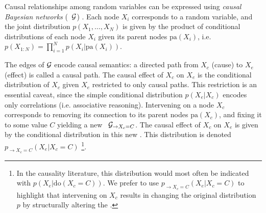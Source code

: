 Causal relationships among random variables can be expressed using \emph{causal Bayesian networks} (\CBNs~${\cal G}$)  \citep{pearl2000,spirtes2000causation,dawid07fundamentals}. Each node $X_i$ corresponds to a random variable, and the joint distribution $p(X_1, \ldots, X_N)$ is given by the product of conditional distributions of each node $X_i$ given its parent nodes $\textrm{pa}(X_i)$, i.e.~$p(X_{1:N})=\prod_{i=1}^Np(X_i|\textrm{pa}(X_i))$. 

The edges of ${\cal G}$ encode causal semantics: a directed path from $X_c$ (cause) to $X_e$ (effect) is called a causal path. The causal effect of $X_c$ on $X_e$ is the conditional distribution of $X_c$ given $X_e$ restricted to only causal paths. This restriction is an essential caveat, since the simple conditional distribution \(p(X_e|X_c)\) encodes only correlations (i.e. associative reasoning). Intervening on a node $X_c$ corresponds to removing its connection to its parent nodes  $\textrm{pa}(X_c)$, and fixing it to some value $C$ yielding a new \CBN~${\cal G}_{\rightarrow X_c = C}$. The causal effect of $X_c$ on $X_e$ is given by the conditional distribution in this new \CBN. This distribution is denoted $p_{\rightarrow X_c = C}(X_e|X_c = C)$
\footnote{In the causality literature, this distribution would most often be indicated with $p(X_e|\textrm{do}(X_c = C))$. We prefer to use $p_{\rightarrow X_c = C}(X_e|X_c = C)$ to highlight that intervening on $X_c$ results in changing the original distribution $p$ by structurally altering the \CBN.}. 



